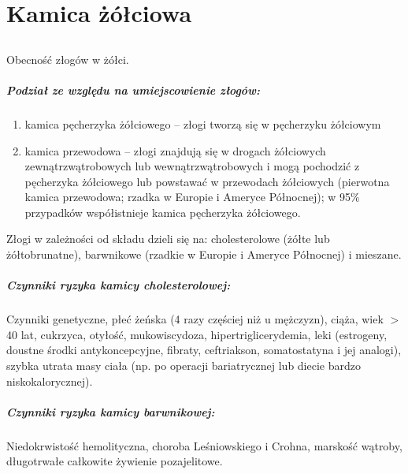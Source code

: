 
\chapter{Kamica żółciowa}

\section{\DiEtp}

Obecność złogów w żółci. 

\paragraph{Podział ze względu na umiejscowienie złogów:}

\begin{enumerate}
    \item kamica pęcherzyka żółciowego – złogi tworzą się w pęcherzyku żółciowym

    \item kamica przewodowa – złogi znajdują się w drogach żółciowych zewnątrzwątrobowych lub wewnątrzwątrobowych i mogą pochodzić z pęcherzyka żółciowego lub powstawać w przewodach żółciowych (pierwotna kamica przewodowa; rzadka w Europie i Ameryce Północnej); w 95\% przypadków współistnieje kamica pęcherzyka żółciowego.
\end{enumerate}

Złogi w zależności od składu dzieli się na: cholesterolowe (żółte lub żółtobrunatne), barwnikowe (rzadkie w Europie i Ameryce Północnej) i mieszane.

\paragraph{Czynniki ryzyka kamicy cholesterolowej:}
Czynniki genetyczne, płeć żeńska (4 razy częściej niż u mężczyzn), ciąża, wiek $>$40 lat, cukrzyca, otyłość, mukowiscydoza, hipertriglicerydemia, leki (estrogeny, doustne środki antykoncepcyjne, fibraty, ceftriakson, somatostatyna i jej analogi), szybka utrata masy ciała (np. po operacji bariatrycznej lub diecie bardzo niskokalorycznej). 

\paragraph{Czynniki ryzyka kamicy barwnikowej:}
Niedokrwistość hemolityczna, choroba Leśniowskiego i Crohna, marskość wątroby, długotrwałe całkowite żywienie pozajelitowe.
